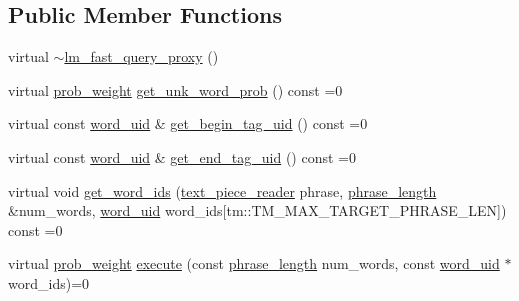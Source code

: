 \subsection*{Public Member Functions}
\begin{DoxyCompactItemize}
\item 
virtual \hyperlink{classuva_1_1smt_1_1bpbd_1_1server_1_1lm_1_1proxy_1_1lm__fast__query__proxy_a6b4664af2410afab683fd1bead0b1e70}{$\sim$lm\+\_\+fast\+\_\+query\+\_\+proxy} ()
\item 
virtual \hyperlink{namespaceuva_1_1smt_1_1bpbd_1_1server_a01e9ea4de9c226f4464862e84ff0bbcc}{prob\+\_\+weight} \hyperlink{classuva_1_1smt_1_1bpbd_1_1server_1_1lm_1_1proxy_1_1lm__fast__query__proxy_a29b76828280a46ed9b412cdefbc322cc}{get\+\_\+unk\+\_\+word\+\_\+prob} () const  =0
\item 
virtual const \hyperlink{namespaceuva_1_1smt_1_1bpbd_1_1server_a6bfe45ba344d65a7fdd7d26156328ddc}{word\+\_\+uid} \& \hyperlink{classuva_1_1smt_1_1bpbd_1_1server_1_1lm_1_1proxy_1_1lm__fast__query__proxy_a369852874000538d14dda7ed8fea9176}{get\+\_\+begin\+\_\+tag\+\_\+uid} () const  =0
\item 
virtual const \hyperlink{namespaceuva_1_1smt_1_1bpbd_1_1server_a6bfe45ba344d65a7fdd7d26156328ddc}{word\+\_\+uid} \& \hyperlink{classuva_1_1smt_1_1bpbd_1_1server_1_1lm_1_1proxy_1_1lm__fast__query__proxy_a9649253956a68463a4f6f0bffd325ace}{get\+\_\+end\+\_\+tag\+\_\+uid} () const  =0
\item 
virtual void \hyperlink{classuva_1_1smt_1_1bpbd_1_1server_1_1lm_1_1proxy_1_1lm__fast__query__proxy_a4847cbd47aa8fb863962b1f372d42337}{get\+\_\+word\+\_\+ids} (\hyperlink{classuva_1_1utils_1_1file_1_1text__piece__reader}{text\+\_\+piece\+\_\+reader} phrase, \hyperlink{namespaceuva_1_1smt_1_1bpbd_1_1server_af068a19c2e03116caf3e3827a3e40e35}{phrase\+\_\+length} \&num\+\_\+words, \hyperlink{namespaceuva_1_1smt_1_1bpbd_1_1server_a6bfe45ba344d65a7fdd7d26156328ddc}{word\+\_\+uid} word\+\_\+ids\mbox{[}tm\+::\+T\+M\+\_\+\+M\+A\+X\+\_\+\+T\+A\+R\+G\+E\+T\+\_\+\+P\+H\+R\+A\+S\+E\+\_\+\+L\+E\+N\mbox{]}) const  =0
\item 
virtual \hyperlink{namespaceuva_1_1smt_1_1bpbd_1_1server_a01e9ea4de9c226f4464862e84ff0bbcc}{prob\+\_\+weight} \hyperlink{classuva_1_1smt_1_1bpbd_1_1server_1_1lm_1_1proxy_1_1lm__fast__query__proxy_afa170cafb434dec366b290e2eee8278a}{execute} (const \hyperlink{namespaceuva_1_1smt_1_1bpbd_1_1server_af068a19c2e03116caf3e3827a3e40e35}{phrase\+\_\+length} num\+\_\+words, const \hyperlink{namespaceuva_1_1smt_1_1bpbd_1_1server_a6bfe45ba344d65a7fdd7d26156328ddc}{word\+\_\+uid} $\ast$word\+\_\+ids)=0

\end{DoxyCompactItemize}
